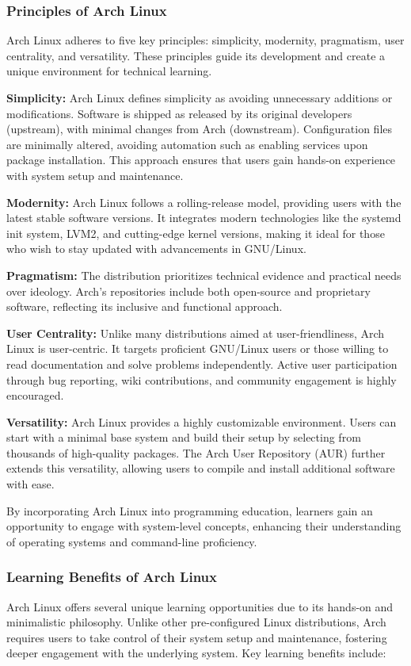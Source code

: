 \documentclass[12pt]{article}
\begin{document}
\subsubsection{Principles of Arch Linux}
Arch Linux adheres to five key principles: simplicity, modernity, pragmatism, user centrality, and versatility. These principles guide its development and create a unique environment for technical learning.

\textbf{Simplicity:} Arch Linux defines simplicity as avoiding unnecessary additions or modifications. Software is shipped as released by its original developers (upstream), with minimal changes from Arch (downstream). Configuration files are minimally altered, avoiding automation such as enabling services upon package installation. This approach ensures that users gain hands-on experience with system setup and maintenance.

\textbf{Modernity:} Arch Linux follows a rolling-release model, providing users with the latest stable software versions. It integrates modern technologies like the systemd init system, LVM2, and cutting-edge kernel versions, making it ideal for those who wish to stay updated with advancements in GNU/Linux.

\textbf{Pragmatism:} The distribution prioritizes technical evidence and practical needs over ideology. Arch’s repositories include both open-source and proprietary software, reflecting its inclusive and functional approach.

\textbf{User Centrality:} Unlike many distributions aimed at user-friendliness, Arch Linux is user-centric. It targets proficient GNU/Linux users or those willing to read documentation and solve problems independently. Active user participation through bug reporting, wiki contributions, and community engagement is highly encouraged.

\textbf{Versatility:} Arch Linux provides a highly customizable environment. Users can start with a minimal base system and build their setup by selecting from thousands of high-quality packages. The Arch User Repository (AUR) further extends this versatility, allowing users to compile and install additional software with ease.

By incorporating Arch Linux into programming education, learners gain an opportunity to engage with system-level concepts, enhancing their understanding of operating systems and command-line proficiency.

\subsubsection{Learning Benefits of Arch Linux}
Arch Linux offers several unique learning opportunities due to its hands-on and minimalistic philosophy. Unlike other pre-configured Linux distributions, Arch requires users to take control of their system setup and maintenance, fostering deeper engagement with the underlying system. Key learning benefits include:  
\end{document}
